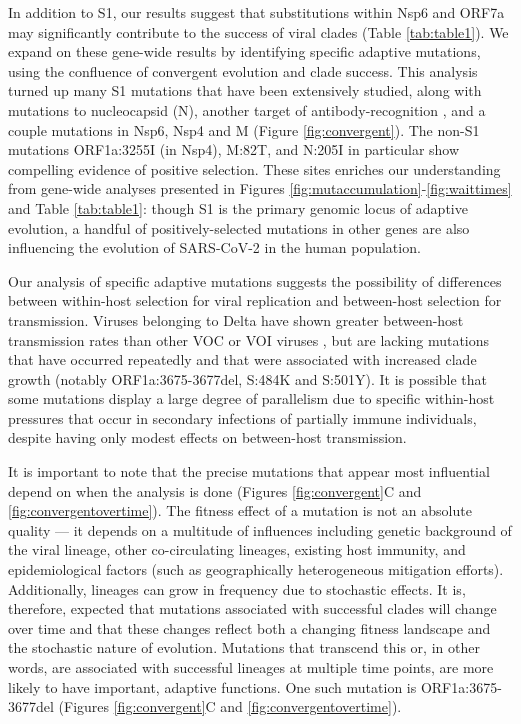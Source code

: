 \documentclass[11pt,oneside,letterpaper]{article}
\begin{document}
In addition to S1, our results suggest that substitutions within Nsp6 and ORF7a may significantly contribute to the success of viral clades (Table \ref{tab:table1}).
We expand on these gene-wide results by identifying specific adaptive mutations, using the confluence of convergent evolution and clade success.
This analysis turned up many S1 mutations that have been extensively studied, along with mutations to nucleocapsid (N), another target of antibody-recognition \cite{Kang2021-pe}, and a couple mutations in Nsp6, Nsp4 and M (Figure \ref{fig:convergent}).
The non-S1 mutations ORF1a:3255I (in Nsp4), M:82T, and N:205I in particular show compelling evidence of positive selection.
These sites enriches our understanding from gene-wide analyses presented in Figures \ref{fig:mutaccumulation}-\ref{fig:waittimes} and Table \ref{tab:table1}: though S1 is the primary genomic locus of adaptive evolution, a handful of positively-selected mutations in other genes are also influencing the evolution of SARS-CoV-2 in the human population.

Our analysis of specific adaptive mutations suggests the possibility of differences between within-host selection for viral replication and between-host selection for transmission.
Viruses belonging to Delta have shown greater between-host transmission rates than other VOC or VOI viruses \cite{Campbell2021-cx}, but are lacking mutations that have occurred repeatedly and that were associated with increased clade growth (notably ORF1a:3675-3677del, S:484K and S:501Y).
It is possible that some mutations display a large degree of parallelism due to specific within-host pressures that occur in secondary infections of partially immune individuals, despite having only modest effects on between-host transmission.

It is important to note that the precise mutations that appear most influential depend on when the analysis is done (Figures \ref{fig:convergent}C and \ref{fig:convergentovertime}).
The fitness effect of a mutation is not an absolute quality --- it depends on a multitude of influences including genetic background of the viral lineage, other co-circulating lineages, existing host immunity, and epidemiological factors (such as geographically heterogeneous mitigation efforts).
Additionally, lineages can grow in frequency due to stochastic effects.
It is, therefore, expected that mutations associated with successful clades will change over time and that these changes reflect both a changing fitness landscape and the stochastic nature of evolution.
Mutations that transcend this or, in other words, are associated with successful lineages at multiple time points, are more likely to have important, adaptive functions.
One such mutation is ORF1a:3675-3677del (Figures \ref{fig:convergent}C and \ref{fig:convergentovertime}).
\end{document}
